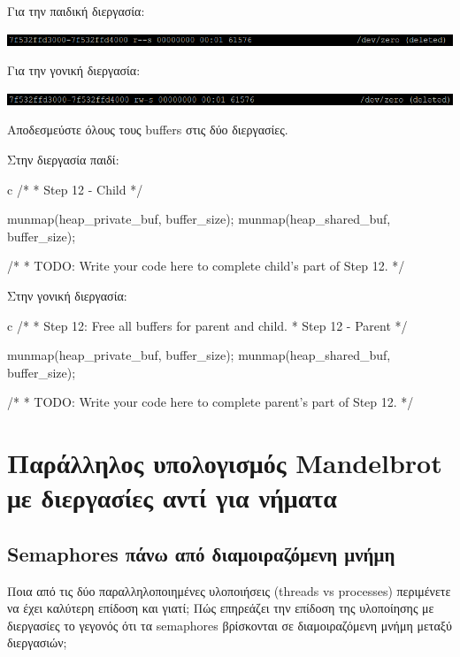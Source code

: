 \documentclass[12pt]{article}
\begin{document}
Για την παιδική διεργασία:

\centerline{\includegraphics[width=1\textwidth]{3_1_11_ChildChange.png}}

Για την γονική διεργασία:

\centerline{\includegraphics[width=1\textwidth]{3_1_11_Parent.png}}

\pagebreak

\begin{question}
Αποδεσμεύστε όλους τους buffers στις δύο διεργασίες.
\end{question}

Στην διεργασία παιδί:

\begin{codeless}{c}
    /*
    * Step 12 - Child
    */
   
   munmap(heap_private_buf, buffer_size);
   munmap(heap_shared_buf, buffer_size);

   /*
    * TODO: Write your code here to complete child's part of Step 12.
    */
\end{codeless}

Στην γονική διεργασία:

\begin{codeless}{c}
    /*
    * Step 12: Free all buffers for parent and child.
    * Step 12 - Parent
    */

   munmap(heap_private_buf, buffer_size);
   munmap(heap_shared_buf, buffer_size);

   /*
    * TODO: Write your code here to complete parent's part of Step 12.
    */
\end{codeless}

\pagebreak

\section{Παράλληλος υπολογισμός Mandelbrot με διεργασίες αντί για νήματα}


\subsection{Semaphores πάνω από διαμοιραζόμενη μνήμη}

\begin{question}
Ποια από τις δύο παραλληλοποιημένες υλοποιήσεις (threads vs processes) περιμένετε 
να έχει καλύτερη επίδοση και γιατί; Πώς επηρεάζει την επίδοση της υλοποίησης 
με διεργασίες το γεγονός ότι τα semaphores βρίσκονται σε διαμοιραζόμενη
μνήμη μεταξύ διεργασιών;
\end{question}
\end{document}
